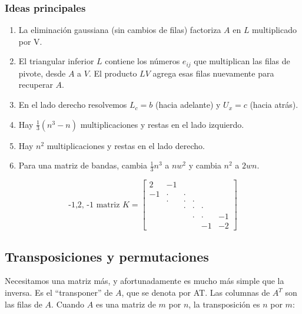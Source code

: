 
\subsubsection{Ideas principales}

\begin{enumerate}
	\item La eliminación gaussiana (sin cambios de filas) factoriza $A$ en $L$ multiplicado por V.
	\item El triangular inferior $L$ contiene los números $e_{ij}$ que multiplican las filas de pivote, desde
	      $A$ a $V$. El producto $LV$ agrega esas filas nuevamente para recuperar $A$.
	\item En el lado derecho resolvemos $L_c= b$ (hacia adelante) y $U_x = c$ (hacia atrás).
	\item Hay $\frac{1}{3}\left(n^3-n\right)$ multiplicaciones y restas en el lado izquierdo.
	\item Hay $n^2$ multiplicaciones y restas en el lado derecho.
	\item Para una matriz de bandas, cambia $\frac{1}{3}n^3$ a $nw^2$ y cambia $n^2$ a $2wn$.
\end{enumerate}

\begin{equation*}
	\text{-1,2, -1 matriz } K=\begin{bmatrix}
		2  & -1    &       &       &       &    \\
		-1 & \cdot & \cdot &       &       &    \\
		   & \cdot & \cdot & \cdot &       &    \\
		   &       & \cdot & \cdot & \cdot &    \\
		   &       &       & \cdot & \cdot & -1 \\
		   &       &       &       & -1    & -2
	\end{bmatrix}
\end{equation*}

\subsection{Transposiciones y permutaciones}

Necesitamos una matriz más, y afortunadamente es mucho más simple que la inversa. Es el
``transponer'' de $A$, que se denota por AT. Las columnas de $A^T$ son las filas de $A$.
Cuando $A$ es una matriz de $m$ por $n$, la transposición es $n$ por $m$:

